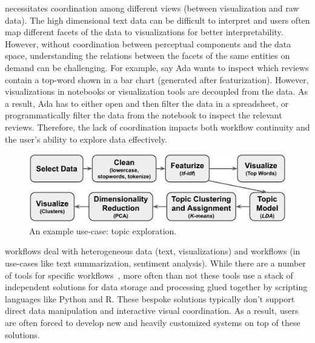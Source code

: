 

  \vita necessitates coordination among different views (\eg between visualization and raw data).  The high dimensional text data can be difficult to interpret and users often map different facets of the data to visualizations for better interpretability. 
However, without coordination between perceptual components and the data space, understanding the relations between the facets of the same entities on demand can be challenging. 
For example, say Ada wants to inspect which reviews contain a top-word shown in a  bar chart (generated after featurization). However, visualizations in notebooks or visualization tools are decoupled from the data. As a result, Ada has to either open and then filter the data in a spreadsheet, or programmatically filter the data from the notebook to inspect the relevant reviews. Therefore, the lack of coordination impacts both workflow continuity and the user's ability to explore data effectively.
 


\begin{figure}[tbp] 
  \centering
  \includegraphics[width=\linewidth]{figures/workflow.png}
  \caption{\small An example \vita use-case: topic exploration.\label{fig:workflow}} 
  \vspace{-20pt}
\end{figure}

 \vita workflows deal with heterogeneous data (\eg text, visualizations) and workflows (\eg in use-cases like text summarization, sentiment analysis). While there are a number of \vita tools for specific workflows~\cite{liu2018bridging}, more often than not these tools use a stack of independent solutions for data storage and
processing glued together by scripting languages like Python and R.
These bespoke solutions typically don’t support direct data manipulation and interactive visual coordination. As a result, users are often forced to develop new and heavily customized systems on top of these solutions.

